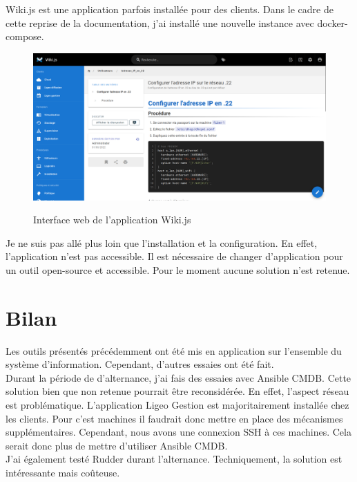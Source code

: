 \documentclass[12pt, a4paper, twoside]{article}
\begin{document}
Wiki.js est une application parfois installée pour des clients. 
Dans le cadre de cette reprise de la documentation, j'ai installé une nouvelle instance avec docker-compose.

\begin{figure}[!ht]
    \centering
    \includegraphics[width=\textwidth]{src/interface_wikijs.png}
    \label{fig:interface_wikijs}
    \caption{Interface web de l'application Wiki.js}
\end{figure}

Je ne suis pas allé plus loin que l'installation et la configuration.
En effet, l'application n'est pas accessible.
Il est nécessaire de changer d'application pour un outil open-source et accessible.
Pour le moment aucune solution n'est retenue.

\newpage
\section{Bilan}
Les outils présentés précédemment ont été mis en application sur l'ensemble du système d'information. 
Cependant, d'autres essaies ont été fait. \\

Durant la période de d'alternance, j'ai fais des essaies avec \gls{Ansible CMDB}. 
Cette solution bien que non retenue pourrait être reconsidérée. 
En effet, l'aspect réseau est problématique.
L'application Ligeo Gestion est majoritairement installée chez les clients.
Pour c'est machines il faudrait donc mettre en place des mécanismes supplémentaires.
Cependant, nous avons une connexion SSH à ces machines.
Cela serait donc plus de mettre d'utiliser \gls{Ansible CMDB}. \\

J'ai également testé Rudder durant l'alternance. 
Techniquement, la solution est intéressante mais coûteuse. \\
\end{document}
